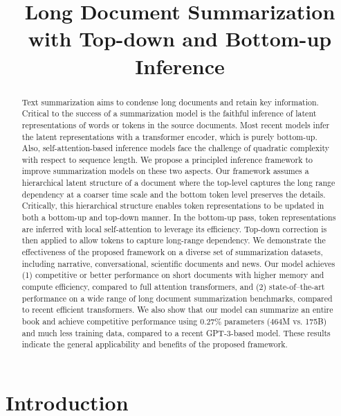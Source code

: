 \title{Long Document Summarization with Top-down and Bottom-up Inference}



\maketitle

\begin{abstract}
Text summarization aims to condense long documents and retain key information. Critical to the success of a summarization model is the faithful inference of latent representations of words or tokens in the source documents. Most recent models infer the latent representations with a transformer encoder, which is purely bottom-up. Also, self-attention-based inference models face the challenge of quadratic complexity with respect to sequence length. We propose a principled inference framework to improve summarization models on these two aspects. Our framework assumes a hierarchical latent structure of a document where the top-level captures the long range dependency at a coarser time scale and the bottom token level preserves the details. Critically, this hierarchical structure enables token representations to be updated in both a bottom-up and top-down manner. In the bottom-up pass, token representations are inferred with local self-attention to leverage its efficiency. Top-down correction is then applied to allow tokens to capture long-range dependency. We demonstrate the effectiveness of the proposed framework on a diverse set of summarization datasets, including narrative, conversational, scientific documents and news. Our model achieves (1) competitive or better performance on short documents with higher memory and compute efficiency, compared to full attention transformers, and (2) state-of--the-art performance on a wide range of long document summarization benchmarks, compared to recent efficient transformers. We also show that our model can summarize an entire book and achieve competitive performance using $0.27\%$ parameters (464M vs. 175B) and much less training data, compared to a recent GPT-3-based model. These results indicate the general applicability and benefits of the proposed framework. 
\end{abstract}

\section{Introduction}

